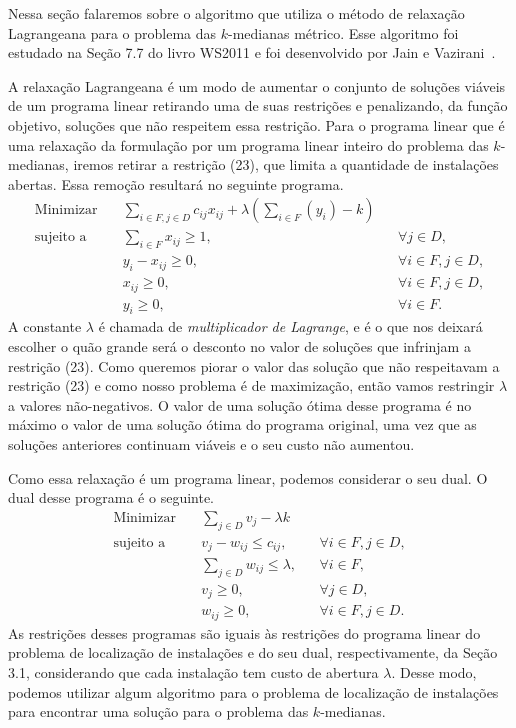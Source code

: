 Nessa seção falaremos sobre o algoritmo que utiliza o método de relaxação Lagrangeana para o problema das $k$-medianas métrico. Esse algoritmo foi estudado na Seção 7.7 do livro WS2011 e foi desenvolvido por Jain e Vazirani~\cite{JV}.

A relaxação Lagrangeana é um modo de aumentar o conjunto de soluções viáveis de um programa linear retirando uma de suas restrições e penalizando, da função objetivo, soluções que não respeitem essa restrição. Para o programa linear que é uma relaxação da formulação por um programa linear inteiro do problema das $k$-medianas, iremos retirar a restrição (23), que limita a quantidade de instalações abertas. Essa remoção resultará no seguinte programa.
\begin{align*}
    \text{Minimizar} \quad & \sum_{i \in F, j \in D} c_{ij}x_{ij} + \lambda \left(\sum_{i \in F} (y_i) - k\right) \\
    \text{sujeito a} \quad & \sum_{i \in F} x_{ij} \geq 1, &&\forall j \in D, \\
                           & y_i - x_{ij} \geq 0, &&\forall i \in F, j \in D, \\
                           & x_{ij} \geq 0, && \forall i \in F,j \in D, \\
                           & y_i \geq 0, &&\forall i \in F.
\end{align*}
A constante $\lambda$ é chamada de \emph{multiplicador de Lagrange}, e é o que nos deixará escolher o quão grande será o desconto no valor de soluções que infrinjam a restrição (23).
Como queremos piorar o valor das solução que não respeitavam a restrição (23) e como nosso problema é de maximização, então vamos restringir $\lambda$ a valores não-negativos.
O valor de uma solução ótima desse programa é no máximo o valor de uma solução ótima do programa original, uma vez que as soluções anteriores continuam viáveis e o seu custo não aumentou.

Como essa relaxação é um programa linear, podemos considerar o seu dual. O dual desse programa é o seguinte.
\begin{align*}
    \text{Minimizar} \quad & \sum_{j \in D} v_j - \lambda k \\
    \text{sujeito a} \quad & v_j - w_{ij} \leq c_{ij}, &&\forall i \in F, j\in D, \\
                           & \sum_{j\in D} w_{ij} \leq \lambda, &&\forall i \in F, \\
                           & v_j \geq 0, &&\forall j\in D, \\
                           & w_{ij} \geq 0, && \forall i \in F,j \in D.
\end{align*}
As restrições desses programas são iguais às restrições do programa linear do problema de localização de instalações e do seu dual, respectivamente, da Seção 3.1, considerando que cada instalação tem custo de abertura $\lambda$.
Desse modo, podemos utilizar algum algoritmo para o problema de localização de instalações para encontrar uma solução para o problema das $k$-medianas. 

